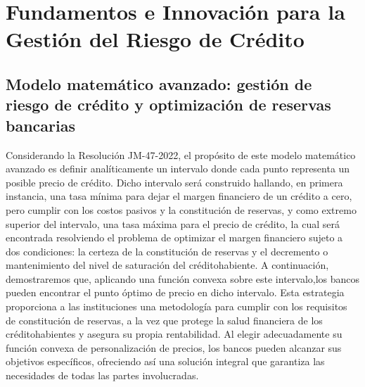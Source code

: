 \section{Fundamentos e Innovación para la Gestión del Riesgo de Crédito}

\subsection{Modelo matemático avanzado: gestión de riesgo de crédito y optimización de reservas bancarias}

Considerando la Resolución JM-47-2022, el propósito de este modelo matemático avanzado es definir analíticamente un intervalo donde cada punto representa un posible precio de crédito. Dicho intervalo será construido hallando, en primera instancia, una tasa mínima para dejar el margen financiero de un crédito a cero, pero cumplir con los costos pasivos y la constitución de reservas, y como extremo superior del intervalo, una tasa máxima para el precio de crédito, la cual será encontrada resolviendo el problema de optimizar el margen financiero sujeto a dos condiciones: la certeza de la constitución de reservas y el decremento o mantenimiento del nivel de saturación del créditohabiente. A continuación, demostraremos que, aplicando una función convexa sobre este intervalo,los bancos pueden encontrar el punto óptimo de precio en dicho intervalo. Esta estrategia proporciona a las instituciones una metodología para cumplir con los requisitos de constitución de reservas, a la vez que protege la salud financiera de los créditohabientes y asegura su propia rentabilidad. Al elegir adecuadamente su función convexa de personalización de precios, los bancos pueden alcanzar sus objetivos específicos, ofreciendo así una solución integral que garantiza las necesidades de todas las partes involucradas.

